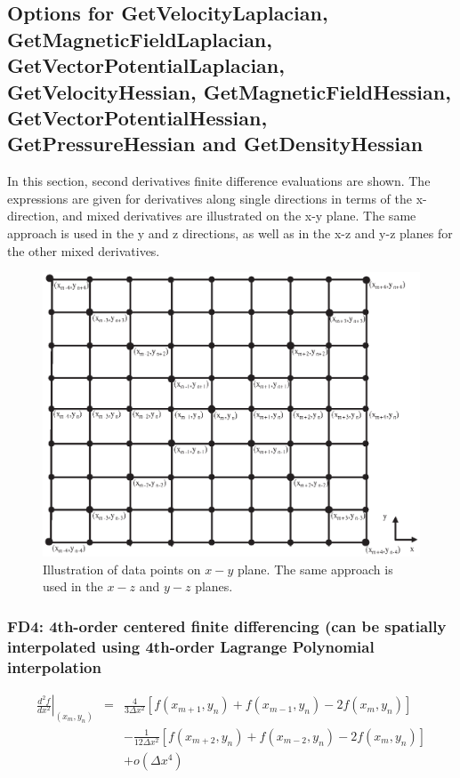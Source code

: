 \documentclass[11pt]{article}
\def\bea{\begin{eqnarray}}
\def\eea{\end{eqnarray}}
\begin{document}
\subsection{Options for GetVelocityLaplacian, GetMagneticFieldLaplacian, GetVectorPotentialLaplacian, GetVelocityHessian, GetMagneticFieldHessian, GetVectorPotentialHessian,
GetPressureHessian and GetDensityHessian}
In this section, second derivatives finite difference evaluations are shown. The expressions are
given for derivatives along single directions in terms of the x-direction, and mixed derivatives are
illustrated on the x-y plane. The same approach is used in the y and z directions, as well as in the x-z and y-z planes
for the other mixed derivatives.
 \begin{figure}[h]
\begin{minipage}{\linewidth}
\centering\includegraphics[width=1.0\linewidth]{2DGrid.eps}
\end{minipage} \caption{Illustration of data points on $x-y$ plane. The same approach is used in the $x-z$ and $y-z$ planes.}\label{2DGrid}
\end{figure}

\subsubsection*{FD4: 4th-order centered finite differencing (can be spatially
interpolated using 4th-order Lagrange Polynomial interpolation}
\bea \left.\frac{d^2f}{dx^2}\right|_{(x_m,y_n)} &=&
\frac{4}{3\Delta
x^2}[f(x_{m+1},y_n)+f(x_{m-1},y_n)-2f(x_m,y_n)]\nonumber\\
&&-\frac{1}{12\Delta
x^2}[f(x_{m+2},y_n)+f(x_{m-2},y_n)-2f(x_m,y_n)]\nonumber\\
&&+o(\Delta x^4) \eea
\end{document}
